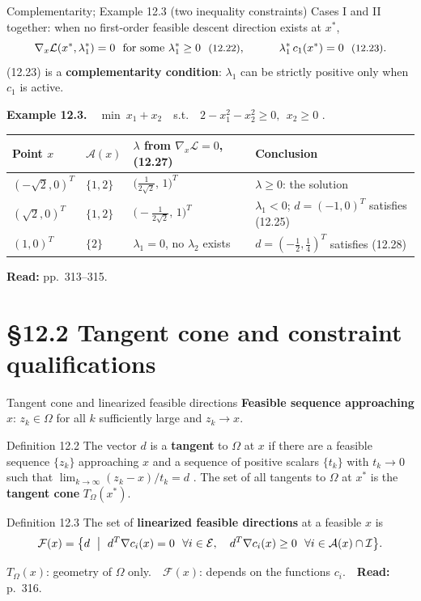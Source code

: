 \documentclass[aspectratio=169,12pt]{beamer}
\newcommand{\xs}{x^{*}}
\newcommand{\eqn}[1]{\text{\small(#1)}}
\newcommand{\readbook}[1]{{\color{red}\textbf{Read:} #1}}
\newcommand{\ls}{\lambda^{*}}
\newcommand{\cA}{\mathcal{A}}
\newcommand{\cE}{\mathcal{E}}
\newcommand{\cF}{\mathcal{F}}
\newcommand{\cI}{\mathcal{I}}
\newcommand{\cL}{\mathcal{L}}
\newcommand{\TO}{T_{\Omega}}
\begin{document}
\begin{frame}{Complementarity; Example 12.3 (two inequality constraints)}
  Cases I and II together: when no first-order feasible descent direction exists at $\xs$,
  \[ \nabla_{x}\cL(\xs,\ls_{1})=0\ \ \text{for some }\ls_{1}\ge 0\ \ \eqn{12.22},\qquad\quad
     \ls_{1}\,c_{1}(\xs)=0\ \ \eqn{12.23}. \]
  (12.23) is a \textbf{complementarity condition}: $\lambda_{1}$ can be strictly positive only when
  $c_{1}$ is active.

  \vspace{0.4em}
  \textbf{Example 12.3.}\ \ $\min\ x_{1}+x_{2}$\ \ s.t.\ \ $2-x_{1}^{2}-x_{2}^{2}\ge 0,\ \ x_{2}\ge 0$ \eqn{12.24}.

  \begin{center}\small\setlength\tabcolsep{5pt}
  \begin{tabular}{llll}
    \toprule
    Point $x$ & $\cA(x)$ & $\lambda$ from $\nabla_{x}\cL=0$, (12.27) & Conclusion \\
    \midrule
    $(-\sqrt2,0)^{T}$ & $\{1,2\}$ & $\bigl(\tfrac{1}{2\sqrt2},\,1\bigr)^{T}$ & $\lambda\ge 0$: the solution \\[0.2em]
    $(\sqrt2,0)^{T}$ & $\{1,2\}$ & $\bigl(-\tfrac{1}{2\sqrt2},\,1\bigr)^{T}$ & $\lambda_{1}<0$; $d=(-1,0)^{T}$ satisfies (12.25) \\[0.2em]
    $(1,0)^{T}$ & $\{2\}$ & $\lambda_{1}=0$, no $\lambda_{2}$ exists & $d=(-\tfrac12,\tfrac14)^{T}$ satisfies (12.28) \\
    \bottomrule
  \end{tabular}
  \end{center}
  \readbook{pp.~313--315.}
\end{frame}

\section{\S12.2 Tangent cone and constraint qualifications}

\begin{frame}{Tangent cone and linearized feasible directions}
  \textbf{Feasible sequence approaching $x$}: $z_{k}\in\Omega$ for all $k$ sufficiently large and $z_{k}\to x$.
  \begin{block}{Definition 12.2}
    The vector $d$ is a \textbf{tangent} to $\Omega$ at $x$ if there are a feasible sequence $\{z_{k}\}$
    approaching $x$ and a sequence of positive scalars $\{t_{k}\}$ with $t_{k}\to 0$ such that
    $\lim_{k\to\infty}(z_{k}-x)/t_{k}=d$ \eqn{12.29}.
    The set of all tangents to $\Omega$ at $\xs$ is the \textbf{tangent cone} $\TO(\xs)$.
  \end{block}
  \begin{block}{Definition 12.3}
    The set of \textbf{linearized feasible directions} at a feasible $x$ is
    \[ \cF(x)=\bigl\{d\ \bigm|\ d^{T}\nabla c_{i}(x)=0\ \ \forall i\in\cE,\quad
       d^{T}\nabla c_{i}(x)\ge 0\ \ \forall i\in\cA(x)\cap\cI\bigr\} . \]
  \end{block}
  $\TO(x)$: geometry of $\Omega$ only.\ \ $\cF(x)$: depends on the functions $c_{i}$.\ \ \readbook{p.~316.}
\end{frame}
\end{document}
